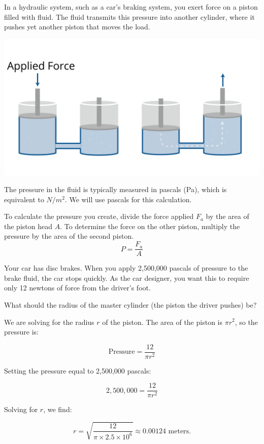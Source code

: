 In a hydraulic system, such as a car's braking system, you exert force on a piston filled with fluid. The fluid transmits this pressure into another cylinder, where it pushes yet another piston that moves the load.

\includegraphics[width=\textwidth]{hydraulicsNew.png}

The pressure in the fluid is typically measured in pascals (Pa), which is equivalent to \(N / m^2\). We will use pascals for this calculation.

To calculate the pressure you create, divide the force applied $F_{a}$ by the area of the piston head $A$. To determine the force on the other piston, multiply the pressure by the area of the second piston.
\[
P = \frac{F_{a}}{A}
\]




\begin{Exercise}[title={Hydraulics}, label=hydraulics]
Your car has disc brakes. When you apply 2,500,000 pascals of pressure to the brake fluid, the car stops quickly. As the car designer, you want this to require only 12 newtons of force from the driver's foot.

What should the radius of the master cylinder (the piston the driver pushes) be?
\end{Exercise}
\begin{Answer}[ref=hydraulics]
We are solving for the radius \( r \) of the piston. The area of the piston is \( \pi r^2 \), so the pressure is:

\[
\text{Pressure} = \frac{12}{\pi r^2}
\]

Setting the pressure equal to 2,500,000 pascals:

\[
2,500,000 = \frac{12}{\pi r^2}
\]

Solving for \( r \), we find:

\[
r = \sqrt{\frac{12}{\pi \times 2.5 \times 10^6}} \approx 0.00124 \text{ meters}.
\]
\end{Answer}
